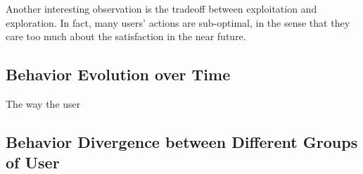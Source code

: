 \documentclass{sigchi}
\begin{document}
Another interesting observation is the tradeoff between exploitation and exploration. In fact, many users' actions are sub-optimal, in the sense that they care too much about the satisfaction in the near future.

\subsection{Behavior Evolution over Time}

The way the user 

\subsection{Behavior Divergence between Different Groups of User}




\end{document}

